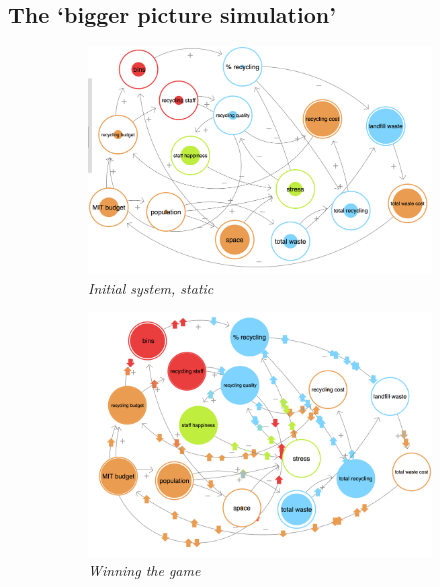 \documentclass[nofonts,nols,justified,nobib]{tufte-book}
\begin{document}
\subsection*{The `bigger picture simulation’}
\begin{figure}
  \centering
  \caption{Developing a more complex approach}
  \label{optimising}
\begin{subfigure}{.3\textwidth}
  \centering
  \includegraphics[width=1\linewidth]{img/3/loopy/big-static.png}
\caption{\textit{Initial system, static}}
\end{subfigure}
 \quad
\begin{subfigure}{.3\textwidth}
  \centering
  \includegraphics[width=1\linewidth]{img/3/loopy/big-win.png}
\caption{\textit{Winning the game}}
  \label{small:win}
\end{subfigure}%
\quad
\begin{subfigure}{.3\textwidth}

\end{subfigure}
\end{figure}
\end{document}
